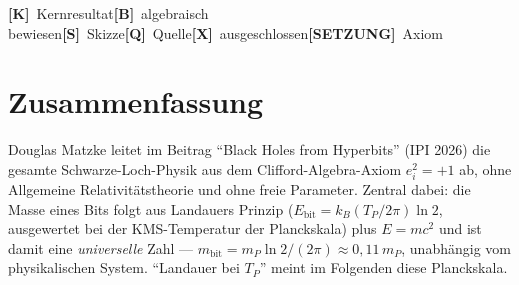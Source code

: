 
\providecommand{\K}{}\renewcommand{\K}{\textbf{[K]}}
\providecommand{\B}{}\renewcommand{\B}{\textbf{[B]}}
\renewcommand{\S}{\textbf{[S]}}
\providecommand{\Q}{}\renewcommand{\Q}{\textbf{[Q]}}
\providecommand{\X}{}\renewcommand{\X}{\textbf{[X]}}
\providecommand{\SETZ}{}\renewcommand{\SETZ}{\textbf{[SETZUNG]}}
\providecommand{\lP}{}\renewcommand{\lP}{\ell_{\mathrm{P}}}
\providecommand{\mP}{}\renewcommand{\mP}{m_{\mathrm{P}}}
\providecommand{\TP}{}\renewcommand{\TP}{T_{\mathrm{P}}}
\renewcommand{\TH}{T_{\mathrm{H}}}
\providecommand{\rs}{}\renewcommand{\rs}{r_{\mathrm{s}}}
\providecommand{\SBH}{}\renewcommand{\SBH}{S_{\mathrm{BH}}}
\providecommand{\xig}{}\renewcommand{\xig}{\xi}
\providecommand{\Tmass}{}\renewcommand{\Tmass}{\tilde{T}}
\providecommand{\Ebit}{}\renewcommand{\Ebit}{E_{\mathrm{bit}}}

\begin{tcolorbox}[ffgftbox, title={Zeichenerklärung}]
  \K\ Kernresultat\quad \B\ algebraisch bewiesen\quad \S\ Skizze\quad \Q\ Quelle\quad \X\ ausgeschlossen\quad \SETZ\ Axiom
\end{tcolorbox}

\section*{Zusammenfassung}

Douglas Matzke leitet im Beitrag \enquote{Black Holes from Hyperbits} (IPI 2026)
die gesamte Schwarze-Loch-Physik aus dem Clifford-Algebra-Axiom $e_i^2=+1$ ab,
ohne Allgemeine Relativitätstheorie und ohne freie Parameter.
Zentral dabei: die Masse eines Bits folgt aus Landauers Prinzip
($E_{\mathrm{bit}} = k_B (T_P/2\pi) \ln 2$, ausgewertet bei der KMS-Temperatur der Planckskala) plus $E=mc^2$ und ist damit eine
\emph{universelle} Zahl — $m_{\mathrm{bit}} = m_P \ln 2/(2\pi) \approx 0{,}11\,m_P$,
unabhängig vom physikalischen System.
\enquote{Landauer bei $T_P$} meint im Folgenden diese Planckskala.

